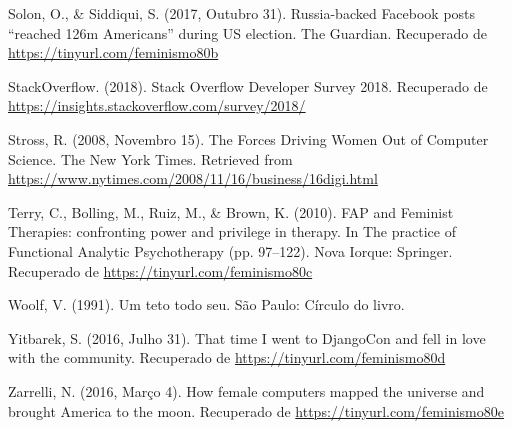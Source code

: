 \hangindent=25pt
\noindent Solon, O., \& Siddiqui, S. (2017, Outubro 31). Russia-backed Facebook posts “reached 126m Americans” during US election. The Guardian. Recuperado de \url{https://tinyurl.com/feminismo80b}

\hangindent=25pt
\noindent StackOverflow. (2018). Stack Overflow Developer Survey 2018. Recuperado de\\ \url{https://insights.stackoverflow.com/survey/2018/}

\hangindent=25pt
\noindent Stross, R. (2008, Novembro 15). The Forces Driving Women Out of Computer Science. The New York Times. Retrieved from \url{https://www.nytimes.com/2008/11/16/business/16digi.html}

\hangindent=25pt
\noindent Terry, C., Bolling, M., Ruiz, M., \& Brown, K. (2010). FAP and Feminist Therapies: confronting power and privilege in therapy. In The practice of Functional Analytic Psychotherapy (pp. 97–122). Nova Iorque: Springer. Recuperado de \url{https://tinyurl.com/feminismo80c}

\hangindent=25pt
\noindent Woolf, V. (1991). Um teto todo seu. São Paulo: Círculo do livro.

\hangindent=25pt
\noindent Yitbarek, S. (2016, Julho 31). That time I went to DjangoCon and fell in love with the community. Recuperado de \url{https://tinyurl.com/feminismo80d}

\hangindent=25pt
\noindent Zarrelli, N. (2016, Março 4). How female computers mapped the universe and brought America to the moon. Recuperado de \url{https://tinyurl.com/feminismo80e}

